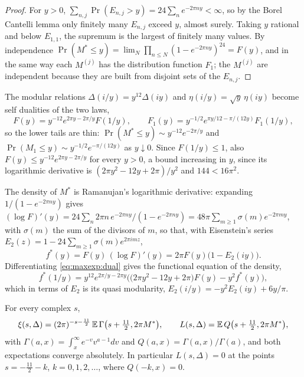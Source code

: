 \begin{proof}
For $y>0$, $\sum_{n,j}\Pr(E_{n,j}>y)=24\sum_ne^{-2\pi ny}<\infty$, so by the Borel Cantelli lemma only finitely many $E_{n,j}$ exceed $y$, almost surely. Taking $y$ rational and below $E_{1,1}$, the supremum is the largest of finitely many values. By independence $\Pr(M^*\le y)=\lim_N\prod_{n\le N}(1-e^{-2\pi ny})^{24}=F(y)$, and in the same way each $M^{(j)}$ has the distribution function $F_1$; the $M^{(j)}$ are independent because they are built from disjoint sets of the $E_{n,j}$.
\end{proof}

The modular relations $\Delta(i/y)=y^{12}\Delta(iy)$ and $\eta(i/y)=\sqrt y\,\eta(iy)$ become self dualities of the two laws,
\begin{equation}\label{eq:maxexp:dual}
F(y)=y^{-12}e^{2\pi y-2\pi/y}F(1/y),\qquad F_1(y)=y^{-1/2}e^{\pi y/12-\pi/(12y)}F_1(1/y),
\end{equation}
so the lower tails are thin: $\Pr(M^*\le y)\sim y^{-12}e^{-2\pi/y}$ and $\Pr(M_1\le y)\sim y^{-1/2}e^{-\pi/(12y)}$ as $y\downarrow0$. Since $F(1/y)\le1$, also $F(y)\le y^{-12}e^{2\pi y-2\pi/y}$ for every $y>0$, a bound increasing in $y$, since its logarithmic derivative is $(2\pi y^2-12y+2\pi)/y^2$ and $144<16\pi^2$.

The density of $M^*$ is Ramanujan's logarithmic derivative: expanding $1/(1-e^{-2\pi ny})$ gives $(\log F)'(y)=24\sum_n2\pi n\,e^{-2\pi ny}/(1-e^{-2\pi ny})=48\pi\sum_{m\ge1}\sigma(m)e^{-2\pi my}$, with $\sigma(m)$ the sum of the divisors of $m$, so that, with Eisenstein's series $E_2(z)=1-24\sum_{m\ge1}\sigma(m)e^{2\pi imz}$,
\begin{equation}\label{eq:maxexp:density}
f^*(y)=F(y)\,(\log F)'(y)=2\pi F(y)\big(1-E_2(iy)\big).
\end{equation}
Differentiating \eqref{eq:maxexp:dual} gives the functional equation of the density,
\[
f^*(1/y)=y^{12}e^{2\pi/y-2\pi y}\Big(\big(2\pi y^2-12y+2\pi\big)F(y)-y^2f^*(y)\Big),
\]
which in terms of $E_2$ is its quasi modularity, $E_2(i/y)=-y^2E_2(iy)+6y/\pi$.

\begin{theorem}\label{thm:maxexp:max}
For every complex $s$,
\begin{equation}\label{eq:ch16:max}
\xi(s,\Delta)=(2\pi)^{-s-\frac{11}2}\,\mathbb{E}\,\Gamma\big(s+\tfrac{11}2,2\pi M^*\big),\qquad L(s,\Delta)=\mathbb{E}\,Q\big(s+\tfrac{11}2,2\pi M^*\big),
\end{equation}
with $\Gamma(a,x)=\int_x^\infty e^{-v}v^{a-1}dv$ and $Q(a,x)=\Gamma(a,x)/\Gamma(a)$, and both expectations converge absolutely. In particular $L(s,\Delta)=0$ at the points $s=-\frac{11}2-k$, $k=0,1,2,\dots$, where $Q(-k,x)=0$.
\end{theorem}

